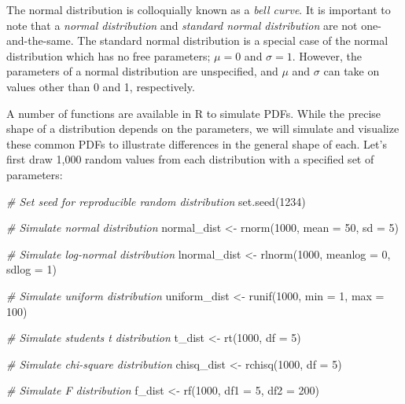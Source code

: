 \documentclass[
]{book}
\newenvironment{Shaded}{\begin{snugshade}}{\end{snugshade}}
\newcommand{\AttributeTok}[1]{\textcolor[rgb]{0.77,0.63,0.00}{#1}}
\newcommand{\CommentTok}[1]{\textcolor[rgb]{0.56,0.35,0.01}{\textit{#1}}}
\newcommand{\DecValTok}[1]{\textcolor[rgb]{0.00,0.00,0.81}{#1}}
\newcommand{\FunctionTok}[1]{\textcolor[rgb]{0.00,0.00,0.00}{#1}}
\newcommand{\NormalTok}[1]{#1}
\newcommand{\OtherTok}[1]{\textcolor[rgb]{0.56,0.35,0.01}{#1}}
\begin{document}
The normal distribution is colloquially known as a \emph{bell curve}. It is important to note that a \emph{normal distribution} and \emph{standard normal distribution} are not one-and-the-same. The standard normal distribution is a special case of the normal distribution which has no free parameters; \(\mu = 0\) and \(\sigma = 1\). However, the parameters of a normal distribution are unspecified, and \(\mu\) and \(\sigma\) can take on values other than 0 and 1, respectively.

A number of functions are available in R to simulate PDFs. While the precise shape of a distribution depends on the parameters, we will simulate and visualize these common PDFs to illustrate differences in the general shape of each. Let's first draw 1,000 random values from each distribution with a specified set of parameters:

\begin{Shaded}
\begin{Highlighting}[]
\CommentTok{\# Set seed for reproducible random distribution}
\FunctionTok{set.seed}\NormalTok{(}\DecValTok{1234}\NormalTok{)}

\CommentTok{\# Simulate normal distribution}
\NormalTok{normal\_dist }\OtherTok{\textless{}{-}} \FunctionTok{rnorm}\NormalTok{(}\DecValTok{1000}\NormalTok{, }\AttributeTok{mean =} \DecValTok{50}\NormalTok{, }\AttributeTok{sd =} \DecValTok{5}\NormalTok{)}

\CommentTok{\# Simulate log{-}normal distribution}
\NormalTok{lnormal\_dist }\OtherTok{\textless{}{-}} \FunctionTok{rlnorm}\NormalTok{(}\DecValTok{1000}\NormalTok{, }\AttributeTok{meanlog =} \DecValTok{0}\NormalTok{, }\AttributeTok{sdlog =} \DecValTok{1}\NormalTok{)}

\CommentTok{\# Simulate uniform distribution}
\NormalTok{uniform\_dist }\OtherTok{\textless{}{-}} \FunctionTok{runif}\NormalTok{(}\DecValTok{1000}\NormalTok{, }\AttributeTok{min =} \DecValTok{1}\NormalTok{, }\AttributeTok{max =} \DecValTok{100}\NormalTok{) }

\CommentTok{\# Simulate student\textquotesingle{}s t distribution}
\NormalTok{t\_dist }\OtherTok{\textless{}{-}} \FunctionTok{rt}\NormalTok{(}\DecValTok{1000}\NormalTok{, }\AttributeTok{df =} \DecValTok{5}\NormalTok{)}

\CommentTok{\# Simulate chi{-}square distribution}
\NormalTok{chisq\_dist }\OtherTok{\textless{}{-}} \FunctionTok{rchisq}\NormalTok{(}\DecValTok{1000}\NormalTok{, }\AttributeTok{df =} \DecValTok{5}\NormalTok{)}

\CommentTok{\# Simulate F distribution}
\NormalTok{f\_dist }\OtherTok{\textless{}{-}} \FunctionTok{rf}\NormalTok{(}\DecValTok{1000}\NormalTok{, }\AttributeTok{df1 =} \DecValTok{5}\NormalTok{, }\AttributeTok{df2 =} \DecValTok{200}\NormalTok{)}
\end{Highlighting}
\end{Shaded}
\end{document}
